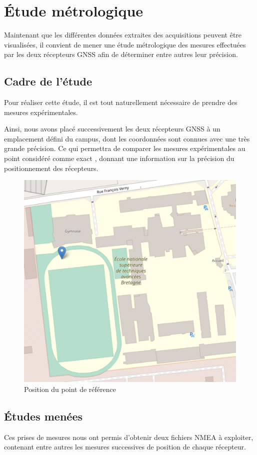 \section{Étude métrologique}\label{sec:etude-metrologique}
   Maintenant que les différentes données extraites des acquisitions peuvent être visualisées, il convient de mener une étude métrologique des mesures effectuées par les deux récepteurs GNSS afin de déterminer entre autres leur précision.

   \subsection{Cadre de l'étude}\label{subsec:cadre-de-l'etude}
      Pour réaliser cette étude, il est tout naturellement nécessaire de prendre des mesures expérimentales.

      Ainsi, nous avons placé successivement les deux récepteurs GNSS à un emplacement défini du campus, dont les coordonnées sont connues avec une très grande précision.
      Ce qui permettra de comparer les mesures expérimentales au point considéré comme \og exact \fg{}, donnant une information sur la précision du positionnement des récepteurs.

      \begin{figure}[h]
          \centering
          \includegraphics[width=.7\textwidth]{imgs/point_fixe}
          \caption{Position du point de référence}
          \label{fig:pt-fixe}
      \end{figure}

   \subsection{Études menées}\label{subsec:etudes-menees}
      Ces prises de mesures nous ont permis d'obtenir deux fichiers NMEA à exploiter, contenant entre autres les mesures successives de position de chaque récepteur.

